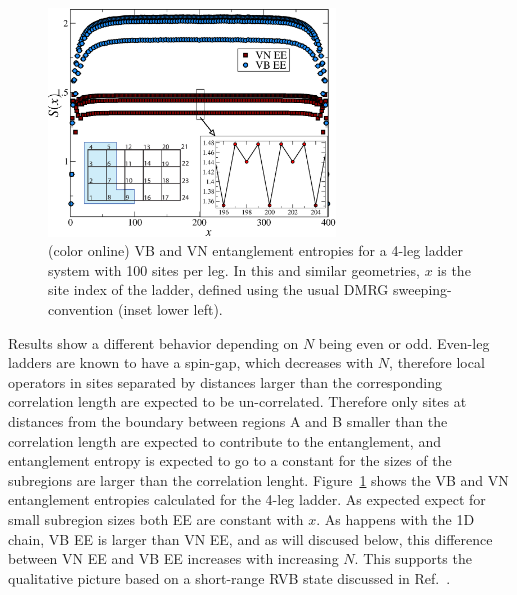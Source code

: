 \documentclass[prl,aps,twocolumn,floatfix,amsmath,amssymb,superscriptaddress,tightenlines]{revtex4}
\begin{document}
\begin{figure} { \includegraphics[width=3in]{FIG2.eps} \caption{(color
online) VB and VN entanglement entropies for a 4-leg
ladder system with 100 sites per leg.  In this and similar geometries, $x$
is the site index of the ladder, defined using the usual DMRG
sweeping-convention (inset lower left).  \label{ladder}}} \end{figure}

Results show a different behavior depending on $N$ being even or odd.
Even-leg ladders are known to have a spin-gap, which decreases with $N$,
therefore local operators in sites separated by distances larger than the
corresponding correlation length are expected to be un-correlated.
Therefore only sites at distances from the boundary between regions A and
B smaller than the correlation length are expected to contribute to the
entanglement, and entanglement entropy is expected to go to a constant for
the sizes of the subregions are larger than the correlation lenght.
Figure~\ref{ladder} shows the VB and VN entanglement entropies calculated
for the 4-leg ladder. As expected expect for small subregion sizes both EE
are constant with $x$. As happens with the 1D chain, VB EE is larger than
VN EE, and as will discused below, this difference between VN EE and VB EE
increases with increasing $N$. This supports the qualitative picture based
on a short-range RVB state discussed in Ref.~\cite{White1994}.
\end{document}
